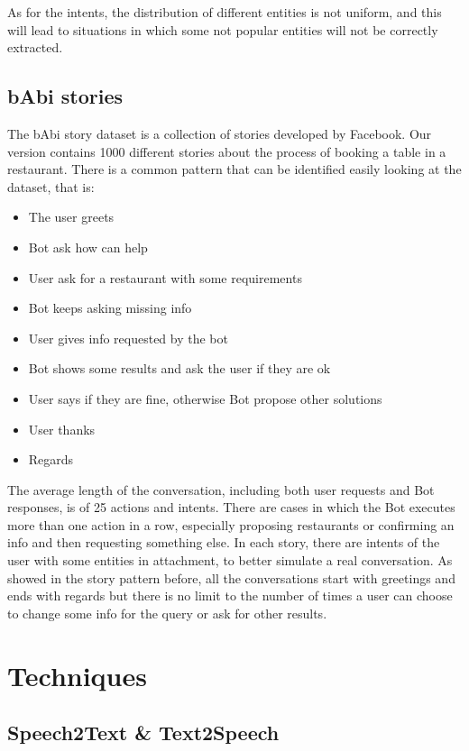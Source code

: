 \documentclass[11pt,a4paper]{article}
\begin{document}
As for the intents, the distribution of different entities is not uniform, and this will lead to situations in which some not popular entities will not be correctly extracted. 

\subsection{bAbi stories}

The bAbi story dataset is a collection of stories developed by Facebook. Our version contains 1000 different stories about the process of booking a table in a restaurant. There is a common pattern that can be identified easily looking at the dataset, that is:

\begin{itemize}
\item The user greets
\item Bot ask how can help
\item User ask for a restaurant with some requirements
\item Bot keeps asking missing info
\item User gives info requested by the bot
\item Bot shows some results and ask the user if they are ok
\item User says if they are fine, otherwise Bot propose other solutions
\item User thanks
\item Regards
\end{itemize}

The average length of the conversation, including both user requests and Bot responses, is of 25 actions and intents. There are cases in which the Bot executes more than one action in a row, especially proposing restaurants or confirming an info and then requesting something else. In each story, there are intents of the user with some entities in attachment, to better simulate a real conversation. As showed in the story pattern before, all the conversations start with greetings and ends with regards but there is no limit to the number of times a user can choose to change some info for the query or ask for other results.

\section{Techniques}

\subsection{Speech2Text \& Text2Speech}
\end{document}
